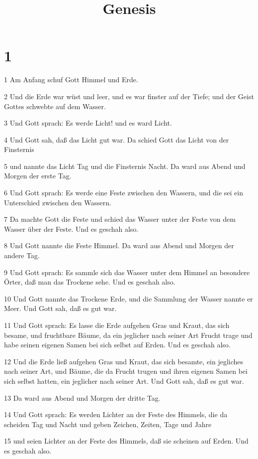 

\title{Genesis}


\chapter{1}

\par 1 Am Anfang schuf Gott Himmel und Erde.
\par 2 Und die Erde war wüst und leer, und es war finster auf der Tiefe; und der Geist Gottes schwebte auf dem Wasser.
\par 3 Und Gott sprach: Es werde Licht! und es ward Licht.
\par 4 Und Gott sah, daß das Licht gut war. Da schied Gott das Licht von der Finsternis
\par 5 und nannte das Licht Tag und die Finsternis Nacht. Da ward aus Abend und Morgen der erste Tag.
\par 6 Und Gott sprach: Es werde eine Feste zwischen den Wassern, und die sei ein Unterschied zwischen den Wassern.
\par 7 Da machte Gott die Feste und schied das Wasser unter der Feste von dem Wasser über der Feste. Und es geschah also.
\par 8 Und Gott nannte die Feste Himmel. Da ward aus Abend und Morgen der andere Tag.
\par 9 Und Gott sprach: Es sammle sich das Wasser unter dem Himmel an besondere Örter, daß man das Trockene sehe. Und es geschah also.
\par 10 Und Gott nannte das Trockene Erde, und die Sammlung der Wasser nannte er Meer. Und Gott sah, daß es gut war.
\par 11 Und Gott sprach: Es lasse die Erde aufgehen Gras und Kraut, das sich besame, und fruchtbare Bäume, da ein jeglicher nach seiner Art Frucht trage und habe seinen eigenen Samen bei sich selbst auf Erden. Und es geschah also.
\par 12 Und die Erde ließ aufgehen Gras und Kraut, das sich besamte, ein jegliches nach seiner Art, und Bäume, die da Frucht trugen und ihren eigenen Samen bei sich selbst hatten, ein jeglicher nach seiner Art. Und Gott sah, daß es gut war.
\par 13 Da ward aus Abend und Morgen der dritte Tag.
\par 14 Und Gott sprach: Es werden Lichter an der Feste des Himmels, die da scheiden Tag und Nacht und geben Zeichen, Zeiten, Tage und Jahre
\par 15 und seien Lichter an der Feste des Himmels, daß sie scheinen auf Erden. Und es geschah also.
